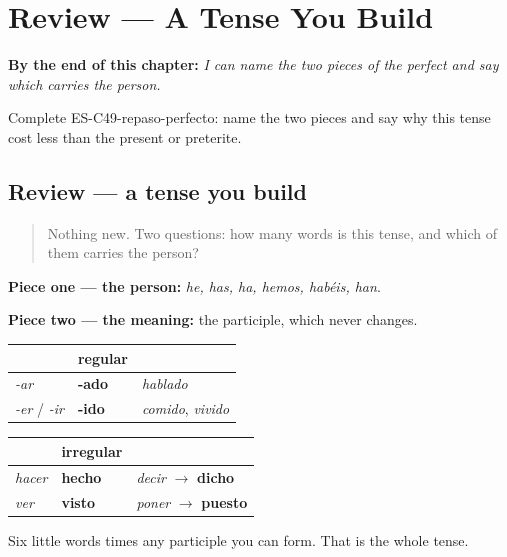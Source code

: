 
\chapter{Review --- A Tense You Build}
\label{ch:review-perfect}

\begin{chapteropening}
\textbf{By the end of this chapter:} \emph{I can name the two pieces of the perfect and say which carries the person.}

Complete ES-C49-repaso-perfecto: name the two pieces and say why this tense cost less than the present or preterite.
\end{chapteropening}

\section[Practice]{Review — a tense you build}

\label{lesson:ES-C49-repaso-perfecto}



\begin{quote}
Nothing new. Two questions: how many words is this tense, and which of them carries the person?
\end{quote}

\begin{grammarlens}[title={What you've built}]
\textbf{Piece one — the person:} \emph{he, has, ha, hemos, habéis, han}.

\textbf{Piece two — the meaning:} the participle, which never changes.

\noindent
\begin{tabularx}{\linewidth}{@{}>{\raggedright\arraybackslash}X>{\raggedright\arraybackslash}X>{\raggedright\arraybackslash}X@{}}
\toprule
\textbf{} & \textbf{regular} & \textbf{} \\
\midrule
\emph{-ar} & \textbf{-ado} & \emph{hablado} \\
\emph{-er} / \emph{-ir} & \textbf{-ido} & \emph{comido}, \emph{vivido} \\
\bottomrule
\end{tabularx}

\noindent
\begin{tabularx}{\linewidth}{@{}>{\raggedright\arraybackslash}X>{\raggedright\arraybackslash}X>{\raggedright\arraybackslash}X@{}}
\toprule
\textbf{} & \textbf{irregular} & \textbf{} \\
\midrule
\emph{hacer} & \textbf{hecho} & \emph{decir} $\to$ \textbf{dicho} \\
\emph{ver} & \textbf{visto} & \emph{poner} $\to$ \textbf{puesto} \\
\bottomrule
\end{tabularx}

Six little words times any participle you can form. That is the whole tense.
\end{grammarlens}

